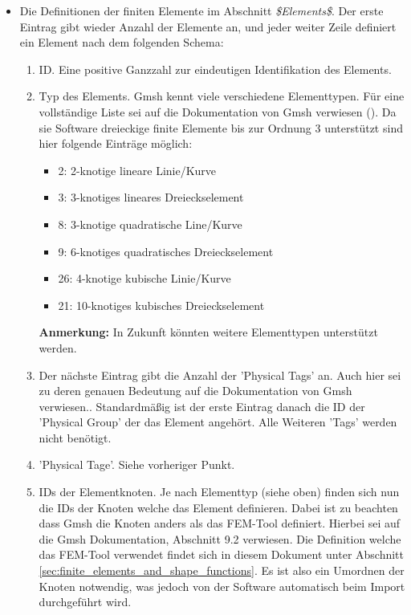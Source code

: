 \begin{itemize}
	\item Die Definitionen der finiten Elemente im Abschnitt \textit{\$Elements\$}. Der erste Eintrag gibt wieder Anzahl der Elemente an, und jeder weiter Zeile definiert ein Element nach dem folgenden Schema:
	\begin{enumerate}
		\item ID. Eine positive Ganzzahl zur eindeutigen Identifikation des Elements.
		\item Typ des Elements. Gmsh kennt viele verschiedene Elementtypen. Für eine vollständige Liste sei auf die Dokumentation von Gmsh verwiesen (\cite{gmsh_website}). Da sie Software dreieckige finite Elemente bis zur Ordnung 3 unterstützt sind hier folgende Einträge möglich:
		\begin{itemize}
			\item 2: 2-knotige lineare Linie/Kurve
			\item 3: 3-knotiges lineares Dreieckselement
			\item 8: 3-knotige quadratische Line/Kurve
			\item 9: 6-knotiges quadratisches Dreieckselement
			\item 26: 4-knotige kubische Linie/Kurve
			\item 21: 10-knotiges kubisches Dreieckselement
		\end{itemize}
		\textbf{Anmerkung:} In Zukunft könnten weitere Elementtypen unterstützt werden.
		\item Der nächste Eintrag gibt die Anzahl der 'Physical Tags' an. Auch hier sei zu deren genauen Bedeutung auf die Dokumentation von Gmsh verwiesen.\cite{gmsh_website}. Standardmäßig ist der erste Eintrag danach die ID der 'Physical Group' der das Element angehört. Alle Weiteren 'Tags' werden nicht benötigt.
		\item 'Physical Tage'. Siehe vorheriger Punkt.
		\item IDs der Elementknoten. Je nach Elementtyp (siehe oben) finden sich nun die IDs der Knoten welche das Element definieren. Dabei ist zu beachten dass Gmsh die Knoten anders als das FEM-Tool definiert. Hierbei sei auf die Gmsh Dokumentation, Abschnitt 9.2 verwiesen. Die Definition welche das FEM-Tool verwendet findet sich in diesem Dokument unter Abschnitt \ref{sec:finite_elements_and_shape_functions}. Es ist also ein Umordnen der Knoten notwendig, was jedoch von der Software automatisch beim Import durchgeführt wird.
	\end{enumerate}
\end{itemize}

